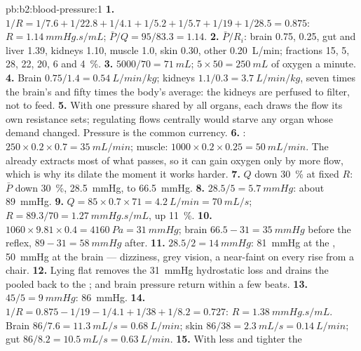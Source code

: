 \begin{solution}{pb:b2:blood-pressure:1}
\textbf{1.} $1/R = 1/7.6 + 1/22.8 + 1/4.1 + 1/5.2 + 1/5.7 + 1/19 +
1/28.5 = 0.875$: $R = \qty{1.14}{mmHg.s/mL}$; $\bar P/Q = 95/83.3 =
1.14$.
\textbf{2.} $\bar P/R_i$: brain 0.75,  0.25, gut and liver
1.39, kidneys 1.10, muscle 1.0, skin 0.30, other \qty{0.20}{L/min};
fractions 15, 5, 28, 22, 20, 6 and \qty{4}{\%}.
\textbf{3.} $5000/70 = \qty{71}{mL}$; $5\times 50 = \qty{250}{mL}$ of
oxygen a minute.
\textbf{4.} Brain $0.75/1.4 = \qty{0.54}{L/min/kg}$; kidneys $1.1/0.3
= \qty{3.7}{L/min/kg}$, seven times the brain's and fifty times the
body's average: the kidneys are perfused to filter, not to feed.
\textbf{5.} With one pressure shared by all organs, each draws the
flow its own resistance sets; regulating flows centrally would
starve any organ whose demand changed. Pressure is the common
currency.
\textbf{6.} : $250\times 0.2\times 0.7 = \qty{35}{mL/min}$;
muscle: $1000\times 0.2\times 0.25 = \qty{50}{mL/min}$. The 
already extracts most of what passes, so it can gain oxygen only by
more flow, which is why its  dilate the moment it works
harder.
\textbf{7.} $Q$ down \qty{30}{\%} at fixed $R$: $\bar P$ down
\qty{30}{\%}, \qty{28.5}{mmHg}, to \qty{66.5}{mmHg}.
\textbf{8.} $28.5/5 = \qty{5.7}{mmHg}$: about \qty{89}{mmHg}.
\textbf{9.} $Q = 85\times 0.7\times 71 = \qty{4.2}{L/min} =
\qty{70}{mL/s}$; $R = 89.3/70 = \qty{1.27}{mmHg.s/mL}$, up
\qty{11}{\%}.
\textbf{10.} $1060\times 9.81\times 0.4 = \qty{4160}{Pa} =
\qty{31}{mmHg}$; brain $66.5 - 31 = \qty{35}{mmHg}$ before the reflex,
$89 - 31 = \qty{58}{mmHg}$ after.
\textbf{11.} $28.5/2 = \qty{14}{mmHg}$: \qty{81}{mmHg} at the ,
\qty{50}{mmHg} at the brain --- dizziness, grey vision, a near-faint
on every rise from a chair.
\textbf{12.} Lying flat removes the \qty{31}{mmHg} hydrostatic loss
and drains the pooled  back to the ;  and
brain pressure return within a few beats.
\textbf{13.} $45/5 = \qty{9}{mmHg}$: \qty{86}{mmHg}.
\textbf{14.} $1/R = 0.875 - 1/19 - 1/4.1 + 1/38 + 1/8.2 = 0.727$: $R =
\qty{1.38}{mmHg.s/mL}$. Brain $86/7.6 = \qty{11.3}{mL/s} =
\qty{0.68}{L/min}$; skin $86/38 = \qty{2.3}{mL/s} = \qty{0.14}{L/min}$;
gut $86/8.2 = \qty{10.5}{mL/s} = \qty{0.63}{L/min}$.
\textbf{15.} With less  and tighter  the 

\end{solution}
